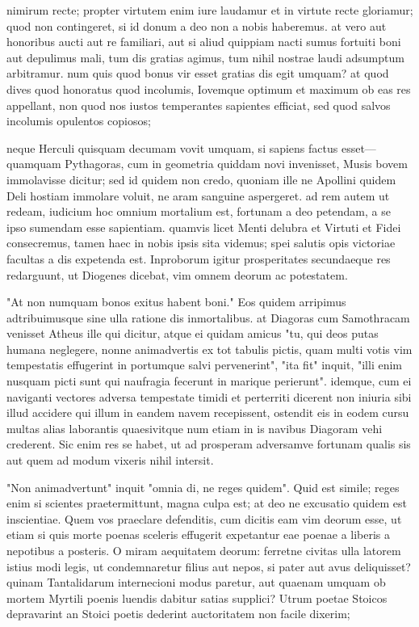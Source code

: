  nimirum recte; propter virtutem enim iure laudamur et in virtute recte gloriamur; quod non contingeret, si id donum a deo non a nobis haberemus. at vero aut honoribus aucti aut re familiari, aut si aliud quippiam nacti sumus fortuiti boni aut depulimus mali, tum dis gratias agimus, tum nihil nostrae laudi adsumptum arbitramur. num quis quod bonus vir esset gratias dis egit umquam? at quod dives quod honoratus quod incolumis, Iovemque optimum et maximum ob eas res appellant, non quod nos iustos temperantes sapientes efficiat, sed quod salvos incolumis opulentos copiosos;

 neque Herculi quisquam decumam vovit umquam, si sapiens factus esset—quamquam Pythagoras, cum in geometria quiddam novi invenisset, Musis bovem immolavisse dicitur; sed id quidem non credo, quoniam ille ne Apollini quidem Deli hostiam immolare voluit, ne aram sanguine aspergeret. ad rem autem ut redeam, iudicium hoc omnium mortalium est, fortunam a deo petendam, a se ipso sumendam esse sapientiam. quamvis licet Menti delubra et Virtuti et Fidei consecremus, tamen haec in nobis ipsis sita videmus; spei salutis opis victoriae facultas a dis expetenda est. Inproborum igitur prosperitates secundaeque res redarguunt, ut Diogenes dicebat, vim omnem deorum ac potestatem.

 "At non numquam bonos exitus habent boni." Eos quidem arripimus adtribuimusque sine ulla ratione dis inmortalibus. at Diagoras cum Samothracam venisset Atheus ille qui dicitur, atque ei quidam amicus "tu, qui deos putas humana neglegere, nonne animadvertis ex tot tabulis pictis, quam multi votis vim tempestatis effugerint in portumque salvi pervenerint", "ita fit" inquit, "illi enim nusquam picti sunt qui naufragia fecerunt in marique perierunt". idemque, cum ei naviganti vectores adversa tempestate timidi et perterriti dicerent non iniuria sibi illud accidere qui illum in eandem navem recepissent, ostendit eis in eodem cursu multas alias laborantis quaesivitque num etiam in is navibus Diagoram vehi crederent. Sic enim res se habet, ut ad prosperam adversamve fortunam qualis sis aut quem ad modum vixeris nihil intersit.

 "Non animadvertunt" inquit "omnia di, ne reges quidem". Quid est simile; reges enim si scientes praetermittunt, magna culpa est; at deo ne excusatio quidem est inscientiae. Quem vos praeclare defenditis, cum dicitis eam vim deorum esse, ut etiam si quis morte poenas sceleris effugerit expetantur eae poenae a liberis a nepotibus a posteris. O miram aequitatem deorum: ferretne civitas ulla latorem istius modi legis, ut condemnaretur filius aut nepos, si pater aut avus deliquisset? quinam Tantalidarum internecioni modus paretur, aut quaenam umquam ob mortem Myrtili poenis luendis dabitur satias supplici? Utrum poetae Stoicos depravarint an Stoici poetis dederint auctoritatem non facile dixerim;

